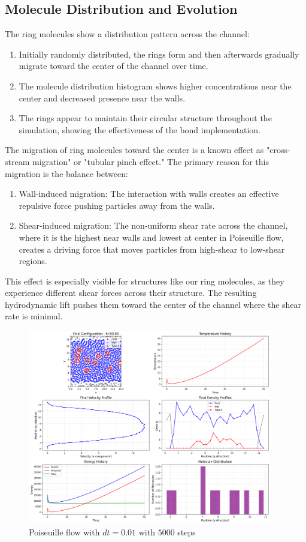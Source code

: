 \subsection{Molecule Distribution and Evolution}
The ring molecules show a distribution pattern across the channel:
\begin{enumerate}
	\item Initially randomly distributed, the rings form and then afterwards gradually migrate toward the center of the channel over time.
	\item The molecule distribution histogram shows higher concentrations near the center and decreased presence near the walls.
	\item The rings appear to maintain their circular structure throughout the simulation, showing the effectiveness of the bond implementation.
\end{enumerate}
The migration of ring molecules toward the center is a known effect as "cross-stream migration" or "tubular pinch effect." The primary reason for this migration is the balance between:
\begin{enumerate}
	\item Wall-induced migration: The interaction with walls creates an effective repulsive force pushing particles away from the walls.
	\item Shear-induced migration: The non-uniform shear rate across the channel, where it is the highest near walls and  lowest at center in Poiseuille flow, creates a driving force that moves particles from high-shear to low-shear regions.
\end{enumerate}
This effect is especially visible for structures like our ring molecules, as they experience different shear forces across their structure. The resulting hydrodynamic lift pushes them toward the center of the channel where the shear rate is minimal.

\begin{figure}[H]
	\begin{center}
		\includegraphics[width=0.95\textwidth]{figures/poiseuille_vis_final_0.01.png}
	\end{center}
	\caption{Poiseuille flow with $dt=0.01$ with $5000$ steps}\label{fig:poiseuille}
\end{figure}

